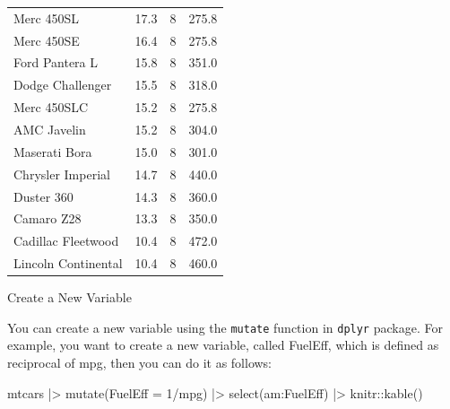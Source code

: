\documentclass[
  letterpaper,
  paper =a4,
  twoside,
  openright,
  headsepline,
  footsepline,
  listof = totocnumbered,
  chapterprefix = true,
  firstiscover]{scrbook}
\newenvironment{Shaded}{\begin{snugshade}}{\end{snugshade}}
\newcommand{\AttributeTok}[1]{\textcolor[rgb]{0.40,0.45,0.13}{#1}}
\newcommand{\DecValTok}[1]{\textcolor[rgb]{0.68,0.00,0.00}{#1}}
\newcommand{\FunctionTok}[1]{\textcolor[rgb]{0.28,0.35,0.67}{#1}}
\newcommand{\NormalTok}[1]{\textcolor[rgb]{0.00,0.23,0.31}{#1}}
\newcommand{\SpecialCharTok}[1]{\textcolor[rgb]{0.37,0.37,0.37}{#1}}
\begin{document}
\begin{longtable}[]{@{}lrrr@{}}
Merc 450SL & 17.3 & 8 & 275.8 \\
Merc 450SE & 16.4 & 8 & 275.8 \\
Ford Pantera L & 15.8 & 8 & 351.0 \\
Dodge Challenger & 15.5 & 8 & 318.0 \\
Merc 450SLC & 15.2 & 8 & 275.8 \\
AMC Javelin & 15.2 & 8 & 304.0 \\
Maserati Bora & 15.0 & 8 & 301.0 \\
Chrysler Imperial & 14.7 & 8 & 440.0 \\
Duster 360 & 14.3 & 8 & 360.0 \\
Camaro Z28 & 13.3 & 8 & 350.0 \\
Cadillac Fleetwood & 10.4 & 8 & 472.0 \\
Lincoln Continental & 10.4 & 8 & 460.0 \\
\end{longtable}

Create a New Variable

You can create a new variable using the \texttt{mutate} function in
\texttt{dplyr} package. For example, you want to create a new variable,
called FuelEff, which is defined as reciprocal of mpg, then you can do
it as follows:

\begin{Shaded}
\begin{Highlighting}[numbers=left,,]
\NormalTok{mtcars }\SpecialCharTok{|\textgreater{}} \FunctionTok{mutate}\NormalTok{(}\AttributeTok{FuelEff =} \DecValTok{1}\SpecialCharTok{/}\NormalTok{mpg) }\SpecialCharTok{|\textgreater{}} \FunctionTok{select}\NormalTok{(am}\SpecialCharTok{:}\NormalTok{FuelEff) }\SpecialCharTok{|\textgreater{}}\NormalTok{ knitr}\SpecialCharTok{::}\FunctionTok{kable}\NormalTok{()}
\end{Highlighting}
\end{Shaded}
\end{document}
